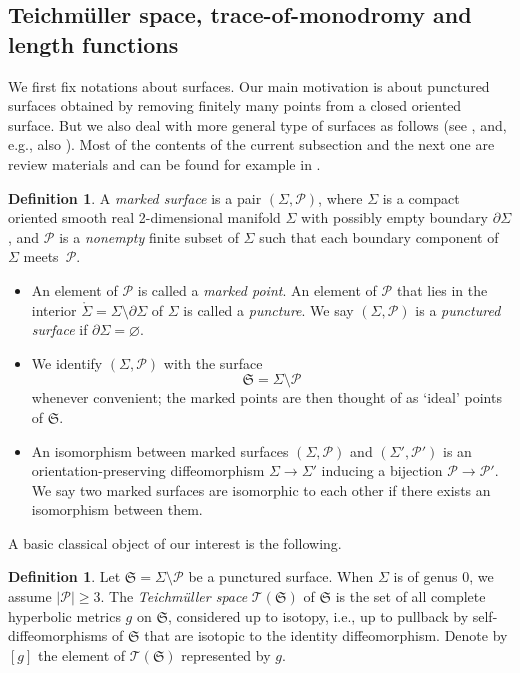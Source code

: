 \documentclass[10pt,a4paper]{amsart}
\numberwithin{equation}{section}
\theoremstyle{definition}
\newtheorem{Definition}[Theorem]{Definition}
\begin{document}
\subsection{Teichm\"uller space, trace-of-monodromy and length functions}
\label{subsec:Teichmuller_space}
We first fix notations about surfaces. Our main motivation is about punctured surfaces obtained by removing finitely many points from a closed oriented surface. But we also deal with more general type of surfaces as follows (see \cite{FG06}, and, e.g., also \cite{Le19}). Most of the contents of the current subsection and the next one are review materials and can be found for example in \cite{P12}.
\begin{Definition}
\label{def:generalized_marked_surface}
A {\em marked surface} is a pair $(\Sigma,\mathcal{P})$, where $\Sigma$ is a compact oriented smooth real 2-dimensional manifold $\Sigma$ with possibly empty boundary $\partial \Sigma$, and $\mathcal{P}$ is a {\it nonempty} finite subset of $\Sigma$ such that each boundary component of~$\Sigma$ meets~$\mathcal{P}$.
\begin{itemize}\itemsep=0pt
\item An element of $\mathcal{P}$ is called a {\em marked point}. An element of $\mathcal{P}$ that lies in the interior $\mathring{\Sigma} = \Sigma\setminus\partial \Sigma$ of $\Sigma$ is called a {\em puncture}. We say $(\Sigma,\mathcal{P})$ is a {\em punctured surface} if $\partial \Sigma = \varnothing $.
\item We identify $(\Sigma,\mathcal{P})$ with the surface
\[
\mathfrak{S} = \Sigma\setminus \mathcal{P}
\]
whenever convenient; the marked points are then thought of as `ideal' points of $\mathfrak{S}$.
\item An isomorphism between marked surfaces $(\Sigma,\mathcal{P})$ and $(\Sigma',\mathcal{P}')$ is an orientation-preserving diffeomorphism $\Sigma \to \Sigma'$ inducing a bijection $\mathcal{P} \to \mathcal{P}'$. We say two marked surfaces are isomorphic to each other if there exists an isomorphism between them.
\end{itemize}
\end{Definition}
A basic classical object of our interest is the following.
\begin{Definition}
\label{def:Teichmuller_space}
Let $\mathfrak{S} = \Sigma \setminus \mathcal{P}$ be a punctured surface. When $\Sigma$ is of genus $0$, we assume $|\mathcal{P}|\ge 3$.
The {\em Teichm\"uller space} $\mathscr{T}(\mathfrak{S})$ of $\mathfrak{S}$ is the set of all complete hyperbolic metrics $g$ on $\mathfrak{S}$, considered up to isotopy, i.e., up to pullback by self-diffeomorphisms of $\mathfrak{S}$ that are isotopic to the identity diffeomorphism. Denote by $[g]$ the element of $\mathscr{T}(\mathfrak{S})$ represented by $g$.
\end{Definition}
\end{document}
